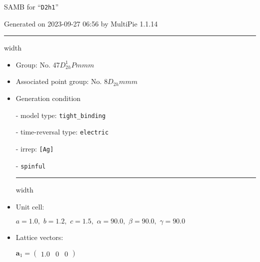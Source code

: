 \documentclass[fleqn,10pt,landscape]{article}
\begin{document}
\setcounter{MaxMatrixCols}{16}

\setlength{\baselineskip}{16pt}
\footnotesize
\begin{center}
\LARGE
SAMB for ``\texttt{D2h1}''
\end{center}
\begin{flushright}
Generated on 2023-09-27 06:56 by MultiPie 1.1.14
\end{flushright}
\vspace{1cm}


 \hfil \hrule height 1mm width \textwidth \hfil

\begin{itemize}
\item Group: No. 47\quad$D_{2h}^{1}$\quad$Pmmm$\quad[ orthorhombic ]

\item Associated point group: No. 8\quad$D_{2h}$\quad$mmm$\quad[ orthorhombic ]

\vspace{5mm}

\item Generation condition

\quad - model type: \texttt{tight_binding}

\quad - time-reversal type: \texttt{electric}

\quad - irrep: \texttt{[Ag]}

\quad - \texttt{spinful}


 \hfil \hrule height 1mm width \textwidth \hfil

\item Unit cell:

\quad $a=1.0,\,\, b=1.2,\,\, c=1.5,\,\, \alpha=90.0,\,\, \beta=90.0,\,\, \gamma=90.0$

\item Lattice vectors:

\quad $\bm{a}_1=\begin{pmatrix} 1.0 & 0 & 0 \end{pmatrix}$


\end{itemize}
\end{document}
